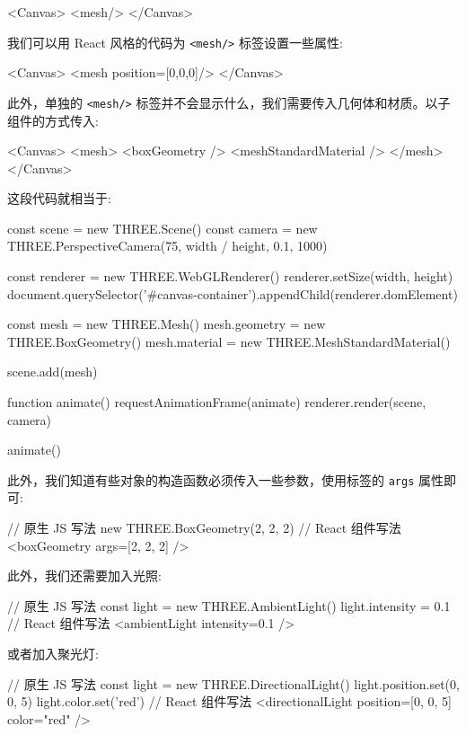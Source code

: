 \begin{JavaScript}
<Canvas>
  <mesh/>
</Canvas>
\end{JavaScript}

我们可以用 React 风格的代码为 \texttt{<mesh/>} 标签设置一些属性:

\begin{JavaScript}
<Canvas>
  <mesh position={[0,0,0]}/>
</Canvas>
\end{JavaScript}

此外，单独的 \texttt{<mesh/>} 标签并不会显示什么，我们需要传入几何体和材质。以子组件的方式传入:

\begin{JavaScript}
<Canvas>
  <mesh>
    <boxGeometry />
    <meshStandardMaterial />
  </mesh>
</Canvas>
\end{JavaScript}

这段代码就相当于:

\begin{JavaScript}
const scene = new THREE.Scene()
const camera = new THREE.PerspectiveCamera(75, width / height, 0.1, 1000)

const renderer = new THREE.WebGLRenderer()
renderer.setSize(width, height)
document.querySelector('#canvas-container').appendChild(renderer.domElement)

const mesh = new THREE.Mesh()
mesh.geometry = new THREE.BoxGeometry()
mesh.material = new THREE.MeshStandardMaterial()

scene.add(mesh)

function animate() {
  requestAnimationFrame(animate)
  renderer.render(scene, camera)
}

animate()
\end{JavaScript}

此外，我们知道有些对象的构造函数必须传入一些参数，使用标签的 \texttt{args} 属性即可:

\begin{JavaScript}
// 原生 JS 写法
new THREE.BoxGeometry(2, 2, 2)
// React 组件写法
<boxGeometry args={[2, 2, 2]} />
\end{JavaScript}

此外，我们还需要加入光照:

\begin{JavaScript}
// 原生 JS 写法
const light = new THREE.AmbientLight()
light.intensity = 0.1
// React 组件写法
<ambientLight intensity={0.1} />
\end{JavaScript}

或者加入聚光灯:

\begin{JavaScript}
// 原生 JS 写法
const light = new THREE.DirectionalLight()
light.position.set(0, 0, 5)
light.color.set('red')
// React 组件写法
<directionalLight position={[0, 0, 5]} color="red" />
\end{JavaScript}

